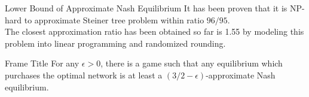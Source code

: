 \documentclass[11pt,aspectratio=169]{beamer}
\begin{document}
\begin{frame}{Lower Bound of Approximate Nash Equilibrium}
It has been proven that it is NP-hard to approximate Steiner tree problem within ratio \(96/95\). \\
The closest approximation ratio has been obtained so far is 1.55 by modeling this problem into linear programming and randomized rounding. 
\end{frame}

\begin{frame}{Frame Title}
For any $\epsilon > 0$, there is a game such that any equilibrium which purchases the optimal network is at least a $(3/2-\epsilon)$-approximate Nash equilibrium.
\end{frame}
\end{document}

